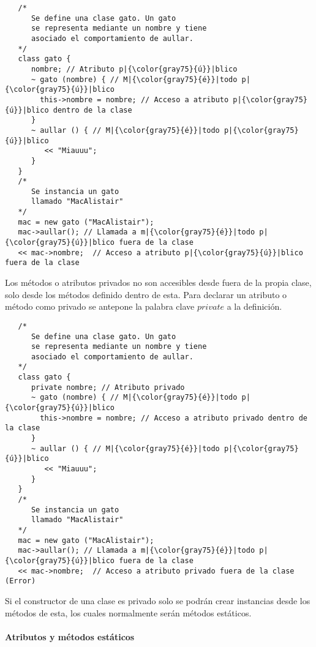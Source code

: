 \begin{lstlisting}
   /*
      Se define una clase gato. Un gato 
      se representa mediante un nombre y tiene
      asociado el comportamiento de aullar.
   */
   class gato {
      nombre; // Atributo p|{\color{gray75}{ú}}|blico
      ~ gato (nombre) { // M|{\color{gray75}{é}}|todo p|{\color{gray75}{ú}}|blico
        this->nombre = nombre; // Acceso a atributo p|{\color{gray75}{ú}}|blico dentro de la clase
      }
      ~ aullar () { // M|{\color{gray75}{é}}|todo p|{\color{gray75}{ú}}|blico
         << "Miauuu";
      }
   }
   /*
      Se instancia un gato 
      llamado "MacAlistair"
   */
   mac = new gato ("MacAlistair"); 
   mac->aullar(); // Llamada a m|{\color{gray75}{é}}|todo p|{\color{gray75}{ú}}|blico fuera de la clase
   << mac->nombre;  // Acceso a atributo p|{\color{gray75}{ú}}|blico fuera de la clase
\end{lstlisting}

Los métodos o atributos privados no son accesibles desde fuera de la propia clase, solo desde los métodos definido dentro de esta. Para 
declarar un atributo o método como privado se antepone la palabra clave $private$ a la definición. \\

\begin{lstlisting}
   /*
      Se define una clase gato. Un gato 
      se representa mediante un nombre y tiene
      asociado el comportamiento de aullar.
   */
   class gato {
      private nombre; // Atributo privado
      ~ gato (nombre) { // M|{\color{gray75}{é}}|todo p|{\color{gray75}{ú}}|blico
        this->nombre = nombre; // Acceso a atributo privado dentro de la clase
      }
      ~ aullar () { // M|{\color{gray75}{é}}|todo p|{\color{gray75}{ú}}|blico
         << "Miauuu";
      }
   }
   /*
      Se instancia un gato 
      llamado "MacAlistair"
   */
   mac = new gato ("MacAlistair"); 
   mac->aullar(); // Llamada a m|{\color{gray75}{é}}|todo p|{\color{gray75}{ú}}|blico fuera de la clase
   << mac->nombre;  // Acceso a atributo privado fuera de la clase (Error)
\end{lstlisting}

Si el constructor de una clase es privado solo se podrán crear instancias desde los métodos de esta, los cuales normalmente serán métodos estáticos. 

\paragraph{Atributos y métodos estáticos}

